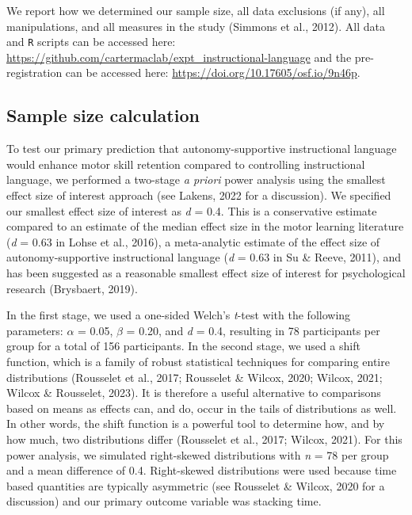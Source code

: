 \documentclass[
  man, donotrepeattitle,mask,floatsintext]{apa7}
\begin{document}
We report how we determined our sample size, all data exclusions (if any), all manipulations, and all measures in the study (Simmons et al., 2012). All data and \texttt{R} scripts can be accessed here: \url{https://github.com/cartermaclab/expt_instructional-language} and the pre-registration can be accessed here: \url{https://doi.org/10.17605/osf.io/9n46p}.

\hypertarget{sample-size-calculation}{%
\subsection{Sample size calculation}\label{sample-size-calculation}}

To test our primary prediction that autonomy-supportive instructional language would enhance motor skill retention compared to controlling instructional language, we performed a two-stage \emph{a priori} power analysis using the smallest effect size of interest approach (see Lakens, 2022 for a discussion). We specified our smallest effect size of interest as \emph{d} = 0.4. This is a conservative estimate compared to an estimate of the median effect size in the motor learning literature (\emph{d} = 0.63 in Lohse et al., 2016), a meta-analytic estimate of the effect size of autonomy-supportive instructional language (\emph{d} = 0.63 in Su \& Reeve, 2011), and has been suggested as a reasonable smallest effect size of interest for psychological research (Brysbaert, 2019).

In the first stage, we used a one-sided Welch's \emph{t}-test with the following parameters: \(\alpha\) = 0.05, \(\beta\) = 0.20, and \emph{d} = 0.4, resulting in 78 participants per group for a total of 156 participants. In the second stage, we used a shift function, which is a family of robust statistical techniques for comparing entire distributions (Rousselet et al., 2017; Rousselet \& Wilcox, 2020; Wilcox, 2021; Wilcox \& Rousselet, 2023). It is therefore a useful alternative to comparisons based on means as effects can, and do, occur in the tails of distributions as well. In other words, the shift function is a powerful tool to determine how, and by how much, two distributions differ (Rousselet et al., 2017; Wilcox, 2021). For this power analysis, we simulated right-skewed distributions with \emph{n} = 78 per group and a mean difference of 0.4. Right-skewed distributions were used because time based quantities are typically asymmetric (see Rousselet \& Wilcox, 2020 for a discussion) and our primary outcome variable was stacking time.
\end{document}
